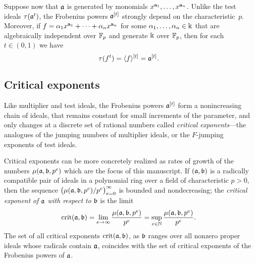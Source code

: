 \documentclass{amsart}
\begin{document}
Suppose now that $\mathfrak{a}$ is generated by monomials $x^{\mathbf{a}_1},\ldots,x^{\mathbf{a}_n}$.
Unlike the test ideals $\tau(\mathfrak{a}^t)$, the Frobenius powers $\mathfrak{a}^{[t]}$ strongly depend on the characteristic~$p$.
Moreover, if $f=\alpha_1x^{\mathbf{a}_1}+\cdots+\alpha_nx^{\mathbf{a}_n}$ for some $\alpha_1,\ldots,\alpha_n \in \Bbbk$ that are algebraically independent over $\mathbb{F}_p$ and generate $\Bbbk$ over $\mathbb{F}_p$, then for each $t \in (0,1)$ we have
\[\tau(f^t) = \langle f \rangle^{[t]} = \mathfrak{a}^{[t]}.\]

\subsection{Critical exponents}

Like multiplier and test ideals, the Frobenius powers $\mathfrak{a}^{[t]}$ form a nonincreasing chain of ideals, that remains constant for small increments of the parameter, and only changes at a discrete set of rational numbers called \emph{critical exponents}---the analogues of the jumping numbers of multiplier ideals, or the $F$-jumping exponents of test ideals.

Critical exponents can be more concretely realized as rates of growth of the numbers $\mu(\mathfrak{a},\mathfrak{b},p^e)$ which are the focus of this manuscript.
If $(\mathfrak{a},\mathfrak{b})$ is a radically compatible pair of ideals in a polynomial ring over a field of characteristic $p>0$, then the sequence $\big(\mu(\mathfrak{a},\mathfrak{b},p^e)/p^e\big)_{e=0}^\infty$ is bounded and nondecreasing; the \emph{critical exponent of $\mathfrak{a}$ with respect to $\mathfrak{b}$} is the limit
\[
   \operatorname{crit}(\mathfrak{a},\mathfrak{b}) = \lim_{e\to \infty} \frac{\mu(\mathfrak{a},\mathfrak{b},p^e)}{p^e}
   = \sup_{e\in \mathbb{N}} \frac{\mu(\mathfrak{a},\mathfrak{b},p^e)}{p^e}.
\]
The set of all critical exponents $\operatorname{crit}(\mathfrak{a},\mathfrak{b})$, as $\mathfrak{b}$ ranges over all nonzero proper ideals whose radicals contain $\mathfrak{a}$, coincides with the set of critical exponents of the Frobenius powers of $\mathfrak{a}$.
\end{document}
